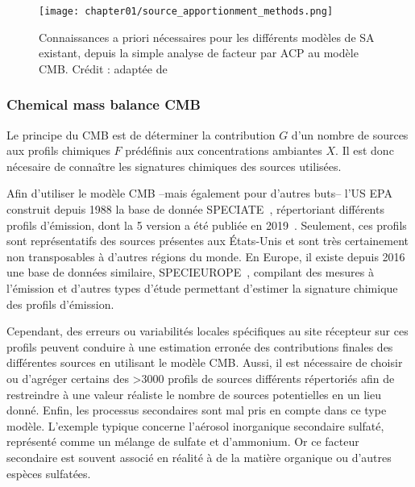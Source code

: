 \begin{figure}[ht]
    \centering
    \texttt{[image: chapter01/source\_apportionment\_methods.png]}
    \caption{
        Connaissances a priori nécessaires pour les différents modèles de SA existant,
        depuis la simple analyse de facteur par ACP au modèle CMB. Crédit :
        \cite{vianaSource2008} adaptée de \cite{schauerCharacterization2006}
    }%
    \label{fig:chapter01/source_apportionment_methods}
\end{figure}

\subsubsection{Chemical mass balance CMB}%
\label{ssub:chemical_mass_balance_cmb}

Le principe du CMB est de déterminer la contribution $G$ d'un nombre de sources
aux profils chimiques $F$ prédéfinis aux concentrations ambiantes $X$. Il est donc
nécesaire de connaître les signatures chimiques des sources utilisées.

Afin d'utiliser le modèle CMB --mais également pour d'autres buts-- l'US EPA construit
depuis 1988 la base de donnée SPECIATE~\autocite{simonDevelopment2010}, répertoriant
différents profils d'émission, dont la 5\ieme{}
version a été publiée en 2019~\autocite{u.s.environmentalprotectionagencySPECIATE2019}.
Seulement, ces profils sont représentatifs des sources présentes aux États-Unis et sont
très certainement non transposables à d'autres régions du monde.
En Europe, il existe depuis 2016 une base de données similaire,
SPECIEUROPE~\autocite{pernigottiSPECIEUROPE2016}, compilant des mesures à l'émission et
d'autres types d'étude permettant d'estimer la signature chimique des profils d'émission.

Cependant, des erreurs ou variabilités locales spécifiques au site récepteur sur ces
profils peuvent conduire à une estimation erronée des contributions finales des
différentes sources en utilisant le modèle CMB.
Aussi, il est nécessaire de choisir ou d'agréger certains des >3000 profils de sources
différents répertoriés afin de restreindre à une valeur réaliste le nombre de sources
potentielles en un lieu donné.
Enfin, les processus secondaires sont mal pris en compte dans ce type modèle. L'exemple typique
concerne l'aérosol inorganique secondaire sulfaté, représenté comme un mélange de sulfate
et d'ammonium. Or ce facteur secondaire est souvent associé en réalité à de la matière
organique ou d'autres espèces sulfatées.

